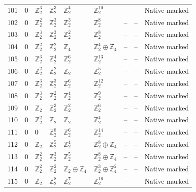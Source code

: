 \documentclass[10pt]{article}
\begin{document}
\begin{longtable}{r|lllll|rrl}
101 & $0$ & $\mathbb{Z}_{2}^{3}$ & $\mathbb{Z}_{2}^{3}$ & $\mathbb{Z}_{2}^{4}$ & $\mathbb{Z}_{2}^{10}$ & -- & -- & Native marked\\
102 & $0$ & $\mathbb{Z}_{2}^{2}$ & $\mathbb{Z}_{2}^{3}$ & $\mathbb{Z}_{2}^{3}$ & $\mathbb{Z}_{2}^{8}$ & -- & -- & Native marked\\
103 & $0$ & $\mathbb{Z}_{2}^{3}$ & $\mathbb{Z}_{2}^{3}$ & $\mathbb{Z}_{2}^{2}$ & $\mathbb{Z}_{2}^{8}$ & -- & -- & Native marked\\
104 & $0$ & $\mathbb{Z}_{2}^{2}$ & $\mathbb{Z}_{2}^{2}$ & $\mathbb{Z}_{4}$ & $\mathbb{Z}_{2}^{4}\oplus \mathbb{Z}_{4}$ & -- & -- & Native marked\\
105 & $0$ & $\mathbb{Z}_{2}^{3}$ & $\mathbb{Z}_{2}^{4}$ & $\mathbb{Z}_{2}^{6}$ & $\mathbb{Z}_{2}^{13}$ & -- & -- & Native marked\\
106 & $0$ & $\mathbb{Z}_{2}^{2}$ & $\mathbb{Z}_{2}^{2}$ & $\mathbb{Z}_{2}$ & $\mathbb{Z}_{2}^{5}$ & -- & -- & Native marked\\
107 & $0$ & $\mathbb{Z}_{2}^{3}$ & $\mathbb{Z}_{2}^{3}$ & $\mathbb{Z}_{2}^{6}$ & $\mathbb{Z}_{2}^{12}$ & -- & -- & Native marked\\
108 & $0$ & $\mathbb{Z}_{2}^{3}$ & $\mathbb{Z}_{2}^{2}$ & $\mathbb{Z}_{2}^{4}$ & $\mathbb{Z}_{2}^{9}$ & -- & -- & Native marked\\
109 & $0$ & $\mathbb{Z}_{2}$ & $\mathbb{Z}_{2}^{3}$ & $\mathbb{Z}_{2}^{2}$ & $\mathbb{Z}_{2}^{6}$ & -- & -- & Native marked\\
110 & $0$ & $\mathbb{Z}_{2}^{2}$ & $\mathbb{Z}_{2}$ & $\mathbb{Z}_{2}$ & $\mathbb{Z}_{2}^{4}$ & -- & -- & Native marked\\
111 & $0$ & $0$ & $\mathbb{Z}_{2}^{8}$ & $\mathbb{Z}_{2}^{6}$ & $\mathbb{Z}_{2}^{14}$ & -- & -- & Native marked\\
112 & $0$ & $\mathbb{Z}_{2}$ & $\mathbb{Z}_{2}^{5}$ & $\mathbb{Z}_{2}^{4}$ & $\mathbb{Z}_{2}^{8}\oplus \mathbb{Z}_{4}$ & -- & -- & Native marked\\
113 & $0$ & $\mathbb{Z}_{2}^{2}$ & $\mathbb{Z}_{2}^{3}$ & $\mathbb{Z}_{2}^{5}$ & $\mathbb{Z}_{2}^{8}\oplus \mathbb{Z}_{4}$ & -- & -- & Native marked\\
114 & $0$ & $\mathbb{Z}_{2}^{2}$ & $\mathbb{Z}_{2}^{2}$ & $\mathbb{Z}_{2}\oplus \mathbb{Z}_{4}$ & $\mathbb{Z}_{2}^{3}\oplus \mathbb{Z}_{4}^{2}$ & -- & -- & Native marked\\
115 & $0$ & $\mathbb{Z}_{2}$ & $\mathbb{Z}_{2}^{8}$ & $\mathbb{Z}_{2}^{7}$ & $\mathbb{Z}_{2}^{16}$ & -- & -- & Native marked\\

\end{longtable}
\end{document}
